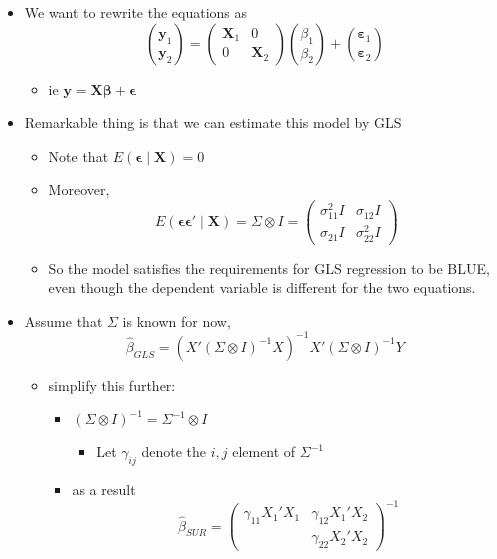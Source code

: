 \documentclass[11pt]{article}
\begin{document}
\begin{itemize}
\item We want to rewrite the equations as
       \[ \binom{\mathbf{y}_1}{\mathbf{y}_2} = (\begin{matrix} \mathbf{X}_1
       & 0 \\ 0 & \mathbf{X}_2  \end{matrix})
       \binom{\beta_1}{\beta_2} +
      \binom{\mathbf{\varepsilon}_1}{\mathbf{\varepsilon}_2} \]
\begin{itemize}
\item ie $\mathbf{y} = \mathbf{X} \mathbf{\beta} + \mathbf{\epsilon}$
\end{itemize}
\item Remarkable thing is that we can estimate this model by GLS
\begin{itemize}
\item Note that $E(\mathbf{\epsilon} \mid \mathbf{X}) = 0$
\item Moreover, \[E(\mathbf{\epsilon} \mathbf{\epsilon}' \mid \mathbf{X}) =
         \Sigma \otimes I = (\begin{matrix} \sigma_{11}^2 I &
         \sigma_{12} I \\ \sigma_{21} I & \sigma_{22}^2
         I \end{matrix})\]
\item So the model satisfies the requirements for GLS regression to
         be BLUE, even though the dependent variable is different for
         the two equations.
\end{itemize}
\item Assume that $\Sigma$ is known for now, 
        \[\hat\beta_{GLS} = (X'(\Sigma \otimes I)^{-1}X)^{-1}X'(\Sigma
        \otimes I)^{-1}Y\]
\begin{itemize}
\item simplify this further:
\begin{itemize}
\item $(\Sigma \otimes I)^{-1} = \Sigma^{-1} \otimes I$
\begin{itemize}
\item Let $\gamma_{ij}$ denote the $i,j$ element of $\Sigma^{-1}$
\end{itemize}
\item as a result
           \[\hat\beta_{SUR} = (\begin{matrix}
            \gamma_{11} X_1'X_1 & \gamma_{12} X_1'X_2 \\
            & \gamma_{22} X_2'X_2 \end{matrix})^{-1} 
\]
\end{itemize}
\end{itemize}
\end{itemize}
\end{document}
